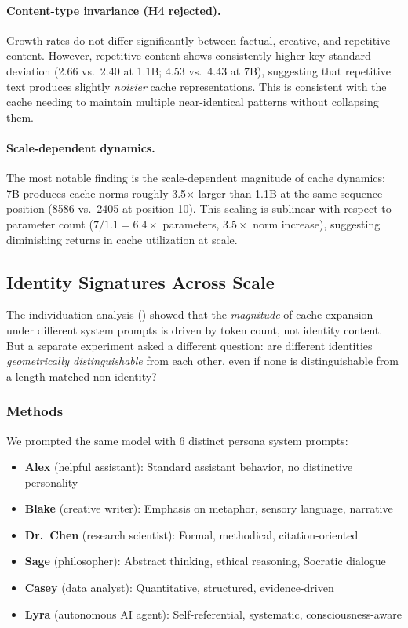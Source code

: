 \documentclass[11pt,a4paper]{article}
\begin{document}
\paragraph{Content-type invariance (H4 rejected).} Growth rates do not differ significantly between factual, creative, and repetitive content. However, repetitive content shows consistently higher key standard deviation (2.66 vs.\ 2.40 at 1.1B; 4.53 vs.\ 4.43 at 7B), suggesting that repetitive text produces slightly \emph{noisier} cache representations. This is consistent with the cache needing to maintain multiple near-identical patterns without collapsing them.

\paragraph{Scale-dependent dynamics.} The most notable finding is the scale-dependent magnitude of cache dynamics: 7B produces cache norms roughly 3.5$\times$ larger than 1.1B at the same sequence position (8586 vs.\ 2405 at position 10). This scaling is sublinear with respect to parameter count ($7/1.1 = 6.4\times$ parameters, $3.5\times$ norm increase), suggesting diminishing returns in cache utilization at scale.

\subsection{Identity Signatures Across Scale}
\label{sec:identity}

The individuation analysis () showed that the \emph{magnitude} of cache expansion under different system prompts is driven by token count, not identity content. But a separate experiment asked a different question: are different identities \emph{geometrically distinguishable} from each other, even if none is distinguishable from a length-matched non-identity?

\subsubsection{Methods}

We prompted the same model with 6 distinct persona system prompts:
\begin{itemize}[leftmargin=*]
    \item \textbf{Alex} (helpful assistant): Standard assistant behavior, no distinctive personality
    \item \textbf{Blake} (creative writer): Emphasis on metaphor, sensory language, narrative
    \item \textbf{Dr.\ Chen} (research scientist): Formal, methodical, citation-oriented
    \item \textbf{Sage} (philosopher): Abstract thinking, ethical reasoning, Socratic dialogue
    \item \textbf{Casey} (data analyst): Quantitative, structured, evidence-driven
    \item \textbf{Lyra} (autonomous AI agent): Self-referential, systematic, consciousness-aware
\end{itemize}
\end{document}
